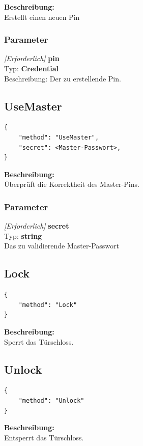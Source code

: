 \textbf{Beschreibung:} \\
Erstellt einen neuen Pin

\subsubsection{Parameter}
\textit{[Erforderlich]} \textbf{pin} \\
Typ: \textbf{Credential} \\
Beschreibung: Der zu erstellende Pin.



\subsection{UseMaster}
\begin{lstlisting}
{
    "method": "UseMaster",
    "secret": <Master-Passwort>,
}
\end{lstlisting}

\textbf{Beschreibung:} \\
Überprüft die Korrektheit des Master-Pins.

\subsubsection{Parameter}
\textit{[Erforderlich]} \textbf{secret} \\
Typ: \textbf{string} \\
Das zu validierende Master-Passwort 



\subsection{Lock}
\begin{lstlisting}
{
    "method": "Lock"
}
\end{lstlisting}

\textbf{Beschreibung:} \\
Sperrt das Türschloss.



\subsection{Unlock}
\begin{lstlisting}
{
    "method": "Unlock"
}
\end{lstlisting}

\textbf{Beschreibung:} \\
Entsperrt das Türschloss.


